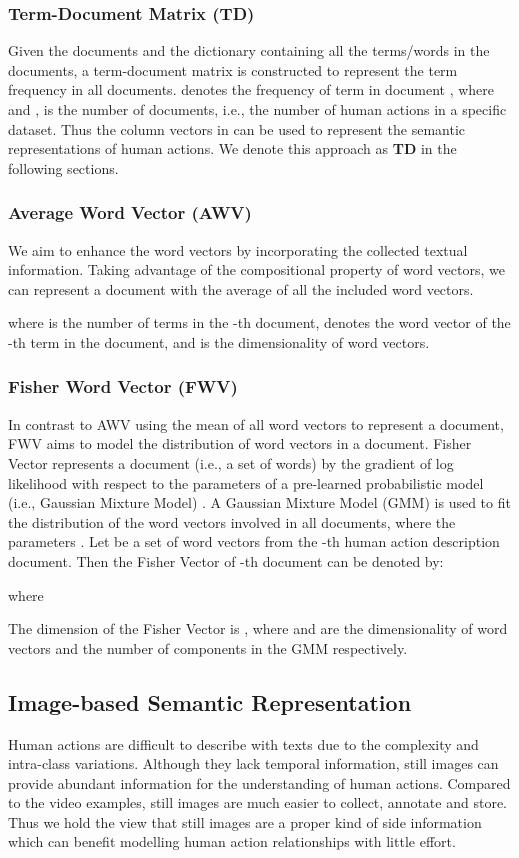 \documentclass[runningheads,a4paper] {llncs}
\begin{document}
\subsubsection{Term-Document Matrix (TD)}
Given the documents and the dictionary containing all the terms/words in the documents, a term-document matrix  is constructed to represent the term frequency in all documents.   denotes the frequency of term  in document , where  and ,  is the number of documents, i.e., the number of human actions in a specific dataset. Thus the column vectors in  can be used to represent the semantic representations of human actions. We denote this approach as \textbf{TD} in the following sections.
\subsubsection{Average Word Vector (AWV)}
We aim to enhance the word vectors by incorporating the collected textual information. Taking advantage of the compositional property of word vectors, we can represent a document with the average of all the included word vectors.

where  is the number of terms in the -th document,  denotes the word vector of the -th term in the document, and  is the dimensionality of word vectors.
\subsubsection{Fisher Word Vector (FWV)}
\label{fwv}
In contrast to AWV using the mean of all word vectors to represent a document, FWV aims to model the distribution of word vectors in a document. Fisher Vector represents a document (i.e., a set of words) by the gradient of log likelihood with respect to the parameters of a pre-learned probabilistic model (i.e., Gaussian Mixture Model) \cite{perronnin2010improving,vedaldi08vlfeat}. A Gaussian Mixture Model (GMM) is used to fit the distribution of the word vectors involved in all documents, where the parameters . Let  be a set of word vectors from the -th human action description document. Then the Fisher Vector of -th document can be denoted by:

where
 


The dimension of the Fisher Vector is , where  and  are the dimensionality of word vectors and the number of components in the GMM respectively.
\subsection{Image-based Semantic Representation}
\label{sect_images}
Human actions are difficult to describe with texts due to the complexity and intra-class variations. Although they lack temporal information, still images can provide abundant information for the understanding of human actions. Compared to the video examples, still images are much easier to collect, annotate and store. Thus we hold the view that still images are a proper kind of side information which can benefit modelling human action relationships with little effort.
\end{document}
